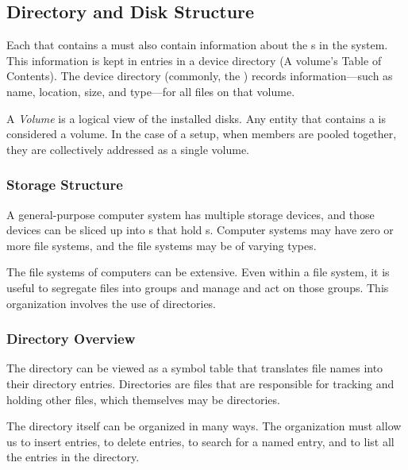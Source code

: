 \subsection{Directory and Disk Structure}\label{subsec:Directory_Disk_Structure}
Each  that contains a  must also contain information about the s in the system.
This information is kept in entries in a device directory (A volume's Table of Contents).
The device directory (commonly, the ) records information—such as name, location, size, and type—for all files on that volume.

\begin{definition}[Volume]\label{def:Volume}
  A \emph{Volume} is a logical view of the installed disks.
  Any entity that contains a  is considered a volume.
  In the case of a  setup, when members are pooled together, they are collectively addressed as a single volume.
\end{definition}

\subsubsection{Storage Structure}\label{subsubsec:Storage_Structure}
A general-purpose computer system has multiple storage devices, and those devices can be sliced up into s that hold s.
Computer systems may have zero or more file systems, and the file systems may be of varying types.

The file systems of computers can be extensive.
Even within a file system, it is useful to segregate files into groups and manage and act on those groups.
This organization involves the use of directories.

\subsubsection{Directory Overview}\label{subsubsec:Directory_Overview}
\begin{definition}[Directory]\label{def:Directory}
  The directory can be viewed as a symbol table that translates file names into their directory entries.
  Directories are files that are responsible for tracking and holding other files, which themselves may be directories.
\end{definition}

The directory itself can be organized in many ways.
The organization must allow us to insert entries, to delete entries, to search for a named entry, and to list all the entries in the directory.

